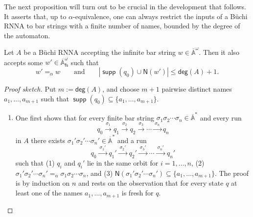 \documentclass[final,a4paper,UKenglish,thm-restate,autoref,numberwithinsect]{lipics-v2021}
\newcommand{\Names}[1]{\mathsf{N}(#1)}
\newcommand{\degree}{\mathsf{deg}}
\newcommand{\barA}{\overline{\names}}
\numberwithin{equation}{section}
\newcommand{\xto}[1]{\xrightarrow{~#1~}}
\newcommand{\seq}{\subseteq}
\newcommand{\fs}{\mathsf{fs}}
\newcommand{\+}[1]{\mathcal{#1}\xspace}
\newcommand{\names}{\mathbb{A}}
\DeclareMathOperator{\supp}{\mathsf{supp}} %
\theoremstyle{definition}
\begin{document}
\noindent The next proposition will turn out to be crucial in the development that follows. It asserts that, up to $\alpha$-equivalence, one can always restrict the inputs of a Büchi RNNA to bar strings with a finite number of names, bounded by the degree of the automaton.
\begin{proposition}\label{lem:restrict_num_names}
  Let $A$ be a Büchi RNNA accepting the infinite bar string $w\in
  \barA^\omega$. Then it also accepts some $w'\in \barA^\omega_\fs$ such
  that
  \[
    w'=_\alpha w
    \qquad\text{and}\qquad
    |\supp (q_0) \cup \Names{w'}|\leq \degree(A)+1.
  \]
\end{proposition}
%
\begin{proof}[Proof sketch]
  Put $m:=\degree(A)$, and choose $m+1$ pairwise distinct names $a_1,\ldots, a_{m+1}$ such that $\supp(q_0)\seq \{a_1,\ldots, a_{m+1}\}$. 

\begin{enumerate} \item One first shows that for every finite bar string $\sigma_1\sigma_2\cdots \sigma_n\in \barA^*$ and every run
\[ q_0\xto{\sigma_1} q_1\xto{\sigma_2} q_2 \xto{\sigma_3} \cdots \xto{\sigma_n} q_n\]
in $A$ there exists $\sigma_1'\sigma_2'\cdots \sigma_n'\in \barA^*$ and a run
  \begin{equation}\label{eq:runparsketch}
    q_0 \xto{\sigma_1'} q_1' \xto{\sigma_2'} q_2' \xto{\sigma_3'} \cdots
    \xto{\sigma_n'} q_n'
  \end{equation}
such that (1) $q_i$ and $q_i'$ lie in the same orbit for $i=1,\ldots, n$, (2) $\sigma_1'\sigma_2'\cdots \sigma_n' =_\alpha \sigma_1\sigma_2\cdots \sigma_n$, and (3) $\Names{\sigma_1'\sigma_2'\cdots \sigma_n'}\seq \{a_1,\ldots, a_{m+1}\}$. The proof is by induction on $n$ and rests on the observation that for every state $q$ at least one of the names $a_1,\ldots, a_{m+1}$ is fresh for $q$. 



\end{enumerate}
\end{proof}
\end{document}
